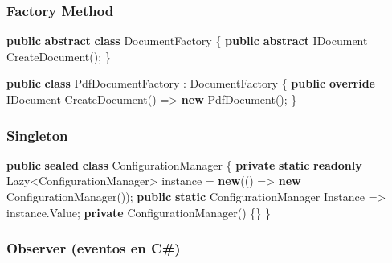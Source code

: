 \documentclass[
  11pt,
  letterpaper,
]{article}
\newenvironment{Shaded}{\begin{snugshade}}{\end{snugshade}}
\newcommand{\FunctionTok}[1]{\textcolor[rgb]{0.28,0.35,0.67}{#1}}
\newcommand{\KeywordTok}[1]{\textcolor[rgb]{0.00,0.23,0.31}{\textbf{#1}}}
\newcommand{\NormalTok}[1]{\textcolor[rgb]{0.00,0.23,0.31}{#1}}
\newcommand{\OperatorTok}[1]{\textcolor[rgb]{0.37,0.37,0.37}{#1}}
\begin{document}
\subsubsection{Factory Method}\label{factory-method}

\begin{Shaded}
\begin{Highlighting}[]
\KeywordTok{public} \KeywordTok{abstract} \KeywordTok{class}\NormalTok{ DocumentFactory}
\OperatorTok{\{}
    \KeywordTok{public} \KeywordTok{abstract}\NormalTok{ IDocument }\FunctionTok{CreateDocument}\OperatorTok{();}
\OperatorTok{\}}

\KeywordTok{public} \KeywordTok{class}\NormalTok{ PdfDocumentFactory }\OperatorTok{:}\NormalTok{ DocumentFactory}
\OperatorTok{\{}
    \KeywordTok{public} \KeywordTok{override}\NormalTok{ IDocument }\FunctionTok{CreateDocument}\OperatorTok{()} \OperatorTok{=\textgreater{}} \KeywordTok{new} \FunctionTok{PdfDocument}\OperatorTok{();}
\OperatorTok{\}}
\end{Highlighting}
\end{Shaded}

\subsubsection{Singleton}\label{singleton}

\begin{Shaded}
\begin{Highlighting}[]
\KeywordTok{public} \KeywordTok{sealed} \KeywordTok{class}\NormalTok{ ConfigurationManager}
\OperatorTok{\{}
    \KeywordTok{private} \KeywordTok{static} \KeywordTok{readonly}\NormalTok{ Lazy}\OperatorTok{\textless{}}\NormalTok{ConfigurationManager}\OperatorTok{\textgreater{}}\NormalTok{ instance }\OperatorTok{=} \KeywordTok{new}\OperatorTok{(()} \OperatorTok{=\textgreater{}} \KeywordTok{new} \FunctionTok{ConfigurationManager}\OperatorTok{());}
    \KeywordTok{public} \KeywordTok{static}\NormalTok{ ConfigurationManager Instance }\OperatorTok{=\textgreater{}}\NormalTok{ instance}\OperatorTok{.}\FunctionTok{Value}\OperatorTok{;}
    \KeywordTok{private} \FunctionTok{ConfigurationManager}\OperatorTok{()} \OperatorTok{\{\}}
\OperatorTok{\}}
\end{Highlighting}
\end{Shaded}

\subsubsection{Observer (eventos en C\#)}\label{observer-eventos-en-c}
\end{document}
